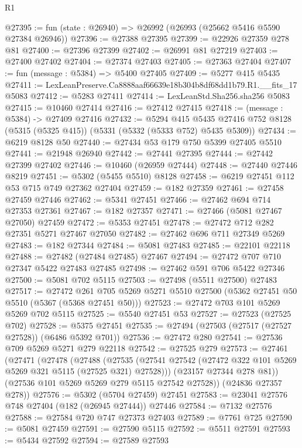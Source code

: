 \begin{lexlean}{R1}
\begin{coremodule}
@27395 := fun (state : @26940) => @26992 (@26993 (@25662 @5416 @5590 @27384 @26946))
@27396 := @27388 @27395
@27399 := @22926 @27359 @278 @81
@27400 := @27396 @27399
@27402 := @26991 @81 @27219
@27403 := @27400 @27402
@27404 := @27374 @27403
@27405 := @27363 @27404
@27407 := fun (message : @5384) => @5400 @27405
@27409 := @5277 @415 @5435
@27411 := LexLeanPreserve.Ca8888aaf66639e18b304b8df68dd1b79.R1.__fits_17 @5083
@27412 := @5283 @27411
@27414 := LexLeanStd.Sha256.sha256 @5083
@27415 := @10460 @27414
@27416 := @27412 @27415
@27418 := (message : @5384) -> @27409 @27416
@27432 := @5294
    @415
    @5435
    @27416
    @752
    @8128
    (@5315 (@5325 @415))
    (@5331 (@5332 (@5333 @752) @5435 @5309))
@27434 := @6219 @8128 @50
@27440 := @27434 @53 @179 @750 @5399 @27405 @5510
@27441 := @21948 @26940
@27442 := @27441 @27395
@27444 := @27442 @27399 @27402
@27446 := @10460 (@26959 @27444)
@27448 := @27440 @27446 @8219
@27451 := @5302 (@5455 @5510) @8128
@27458 := @6219 @27451 @112 @53 @715 @749 @27362 @27404
@27459 := @182 @27359
@27461 := @27458 @27459 @27446
@27462 := @5341 @27451
@27466 := @27462 @694 @714 @27353 @27361
@27467 := @182 @27357
@27471 := @27466 (@5081 @27467 @27050) @27459
@27472 := @5353 @27451
@27478 := @27472 @712 @282 @27351 @5271 @27467 @27050
@27482 := @27462 @696 @711 @27349 @5269
@27483 := @182 @27344
@27484 := @5081 @27483
@27485 := @22101 @22118
@27488 := @27482 (@27484 @27485) @27467
@27494 := @27472 @707 @710 @27347 @5422 @27483 @27485
@27498 := @27462 @591 @706 @5422 @27346
@27500 := @5081 @702 @5115
@27503 := @27498 (@5511 @27500) @27483
@27517 := @27472
    @261
    @705
    @5269
    @5271
    @5510
    @27500
    (@5362 @27451 @50 @5510 (@5367 (@5368 @27451 @50)))
@27523 := @27472 @703 @101 @5269 @5269 @702 @5115
@27525 := @5540 @27451 @53
@27527 := @27523 (@27525 @702)
@27528 := @5375 @27451
@27535 := @27494 (@27503 (@27517 (@27527 @27528)) (@6486 @5392 @701))
@27536 := @27472 @280
@27541 := @27536 @709 @5269 @5271 @279 @22118
@27542 := @27525 @279
@27573 := @27461
    (@27471
      (@27478
        (@27488
          (@27535 (@27541 @27542 (@27472 @322 @101 @5269 @5269 @321 @5115 (@27525 @321) @27528)))
          (@23157 @27344 @278 @81))
        (@27536 @101 @5269 @5269 @279 @5115 @27542 @27528))
      (@24836 @27357 @278))
@27576 := @5302 (@5704 @27459) @27451
@27583 := @23041 @27576 @748 @27404 (@182 (@26945 @27444)) @27446
@27584 := @7132 @27576
@27588 := @27584 @720 @747 @27373 @27403
@27589 := @7761 @725
@27590 := @5081 @27459
@27591 := @27590 @5115
@27592 := @5511 @27591
@27593 := @5434 @27592
@27594 := @27589 @27593

\end{coremodule}
\end{lexlean}
